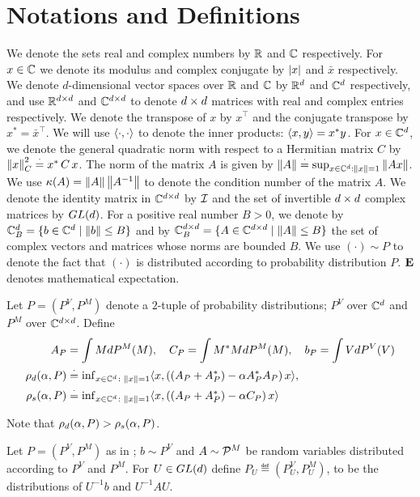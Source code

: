 \section{Notations and Definitions}\label{sec:def}
We denote the sets real and complex numbers by $\R$ and $\C$ respectively. For $x\in \C$ we denote its modulus and complex conjugate by $\md{x}$ and $\bar{x}$ respectively. We denote $d$-dimensional vector spaces over $\R$ and $\C$ by $\R^{d}$ and $\C^{d}$ respectively, and use $\R^{\dcd}$ and $\C^{\dcd}$ to denote $\dcd$ matrices with real and complex entries respectively. We denote the transpose of $x$ by $x^\top$ and the conjugate transpose by $x^*={\bar{x}}^\top$. We will use $\ip{\cdot,\cdot}$ to denote the inner products: $\ip{x,y}=x^* y$. For $x\in\C^d$, we denote the general quadratic norm with respect to a Hermitian matrix $C$ by $\norm{x}^2_C\eqdef x^*\, C \,x$.
The norm of the matrix $A$ is given by $\norm{A}\eqdef \sup_{x\in \C^d:\norm{x}=1} \norm{Ax}$.  We use $\cond{A}=\norm{A}\norm{A^{-1}}$ to denote the condition number of the matrix $A$. We denote the identity matrix in $\C^{\dcd}$ by $\I$ and the set of invertible $\dcd$ complex matrices by $\gld$.
For a positive real number $B>0$, we denote by $\C^{d}_B=\{b\in \C^d\mid \norm{b}\leq B\}$ and by $\C^{\dcd}_B=\{A\in \C^{\dcd}\mid \norm{A}\leq B\}$ the set of complex vectors and matrices whose norms are bounded $B$.
We use $\left(\cdot\right)\sim P$ to denote the fact that $\left(\cdot\right)$ is distributed according to probability distribution $P$.
$\E$ denotes mathematical expectation.
\begin{definition}\label{def:dist}
Let $P=(P^V,P^M)$ denote a $2$-tuple of probability distributions; $P^V$ over $\C^{d}$ and $P^M$ over $\C^{\dcd}$. Define
\begin{align*}
A_P&=\int M dP^M(M),\quad C_P=\int M^* M dP^M(M), \quad b_P=\int V dP^V(V)\\
\rhod{P}&\eqdef {\inf}_{x\in\C^d\colon\norm{x}=1}\ip{x,\left((A_P+A_P^*)-\alpha A_P^* A_P\right)x},\\ \rhos{P}&\eqdef{\inf}_{x\in \C^d\colon\norm{x}=1}\ip{x,\left((A_P+A_P^*)-\alpha C_P\right)x}
\end{align*}
\end{definition}
Note that $\rhod{P}>\rhos{P}$.
\begin{definition}\label{def:simdist}
Let $P=(P^V,P^M)$ as in ; $b\sim P^V$ and $A\sim \P^M$ be random variables distributed according to $P^V$ and $P^M$. For $U\in \gld$ define $P_U\eqdef(P_U^V,P_U^M)$, to be the distributions of $U^{-1}b$ and $U^{-1}AU$.
\end{definition}

